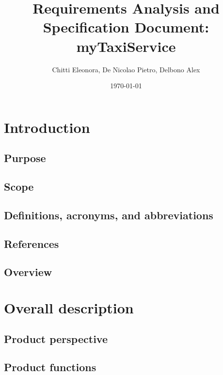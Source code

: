 \documentclass[12pt]{report}
\begin{document}
\title{Requirements Analysis and Specification Document: myTaxiService}
\author{Chitti Eleonora, De Nicolao Pietro, Delbono Alex}
\date{\today}
\maketitle
\tableofcontents

\chapter{Introduction}
\label{ch:introduction}

\section{Purpose}


\section{Scope}


\section{Definitions, acronyms, and abbreviations}


\section{References}


\section{Overview}


\chapter{Overall description}
\label{ch:overall-desc}

\section{Product perspective}


\section{Product functions}

\end{document}
